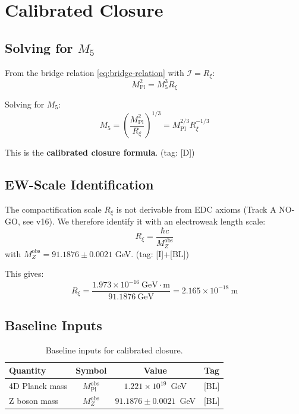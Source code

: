 \documentclass[11pt,a4paper]{article}
\newcommand{\Rxi}{R_\xi}
\newcommand{\Mpl}{M_{\mathrm{Pl}}}
\newcommand{\Mfive}{M_5}
\newcommand{\MZ}{M_Z}
\newcommand{\calI}{\mathcal{I}}
\begin{document}
\section{Calibrated Closure}

\subsection{Solving for $\Mfive$}

From the bridge relation \eqref{eq:bridge-relation} with $\calI = \Rxi$:
\begin{equation}
\Mpl^2 = \Mfive^3 \Rxi
\label{eq:bridge-flat}
\end{equation}

Solving for $\Mfive$:
\begin{equation}
\boxed{\Mfive = \left( \frac{\Mpl^2}{\Rxi} \right)^{1/3} = \Mpl^{2/3} \Rxi^{-1/3}}
\label{eq:M5-closure}
\end{equation}

This is the \textbf{calibrated closure formula}. \hfill (tag: [D])

\subsection{EW-Scale Identification}

The compactification scale $\Rxi$ is not derivable from EDC axioms (Track A
NO-GO, see v16). We therefore identify it with an electroweak length scale:
\begin{equation}
\boxed{\Rxi = \frac{\hbar c}{\MZ^{\mathrm{obs}}}}
\label{eq:Rxi-identification}
\end{equation}
with $\MZ^{\mathrm{obs}} = 91.1876 \pm 0.0021$ GeV. \hfill (tag: [I]+[BL])

This gives:
\begin{equation}
\Rxi = \frac{1.973 \times 10^{-16}~\mathrm{GeV \cdot m}}{91.1876~\mathrm{GeV}}
= 2.165 \times 10^{-18}~\mathrm{m}
\label{eq:Rxi-numerical}
\end{equation}

\subsection{Baseline Inputs}

\begin{table}[h]
\centering
\caption{Baseline inputs for calibrated closure.}
\label{tab:inputs}
\begin{tabular}{@{}lccc@{}}
\toprule
Quantity & Symbol & Value & Tag \\
\midrule
4D Planck mass & $\Mpl^{\mathrm{obs}}$ & $1.221 \times 10^{19}$~GeV & [BL] \\
Z boson mass & $\MZ^{\mathrm{obs}}$ & $91.1876 \pm 0.0021$~GeV & [BL] \\
\bottomrule
\end{tabular}
\end{table}
\end{document}
